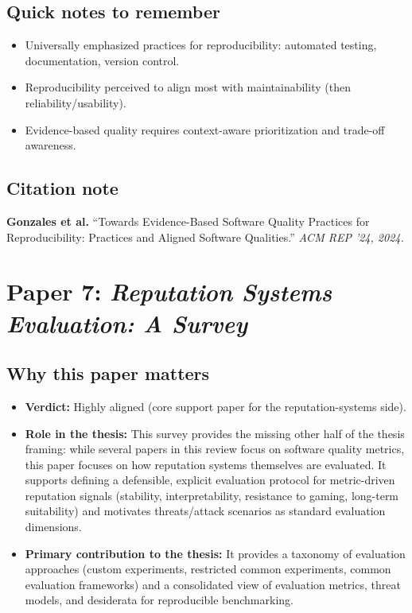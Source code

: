 \documentclass[11pt,a4paper]{article}
\begin{document}
\subsection{Quick notes to remember}
\begin{itemize}[leftmargin=*]
  \item Universally emphasized practices for reproducibility: automated testing, documentation, version control.
  \item Reproducibility perceived to align most with maintainability (then reliability/usability).
  \item Evidence-based quality requires context-aware prioritization and trade-off awareness.
\end{itemize}

\subsection{Citation note}
\noindent\textbf{Gonzales et al.} ``Towards Evidence-Based Software Quality Practices for Reproducibility: Practices and Aligned Software Qualities.'' \textit{ACM REP '24, 2024.}

\newpage
\section{Paper 7: \textit{Reputation Systems Evaluation: A Survey}}

\subsection{Why this paper matters}
\begin{itemize}[leftmargin=*]
  \item \textbf{Verdict:} Highly aligned (core support paper for the reputation-systems side).
  \item \textbf{Role in the thesis:} This survey provides the missing other half of the thesis framing: while several papers in this review focus on software quality metrics, this paper focuses on how reputation systems themselves are evaluated. It supports defining a defensible, explicit evaluation protocol for metric-driven reputation signals (stability, interpretability, resistance to gaming, long-term suitability) and motivates threats/attack scenarios as standard evaluation dimensions.
  \item \textbf{Primary contribution to the thesis:} It provides a taxonomy of evaluation approaches (custom experiments, restricted common experiments, common evaluation frameworks) and a consolidated view of evaluation metrics, threat models, and desiderata for reproducible benchmarking.
\end{itemize}
\end{document}

